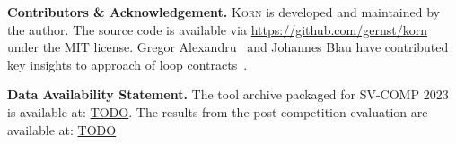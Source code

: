 \documentclass{llncs}
\newcommand{\Korn}{\textsc{Korn}\xspace}
\begin{document}
% 

\smallskip

\textbf{Contributors \& Acknowledgement.}
\Korn is developed and maintained by the author.
The source code is available via \url{https://github.com/gernst/korn} under the MIT license.
Gregor Alexandru~\cite{alexandru2019} and Johannes Blau have contributed
key insights to approach of loop contracts~\cite{ernst:vmcai2022}.

\smallskip

\textbf{Data Availability Statement.}
The tool archive packaged for SV-COMP 2023 is available at:
\url{TODO}.
The results from the post-competition evaluation are available at:
\url{TODO}



\end{document}
